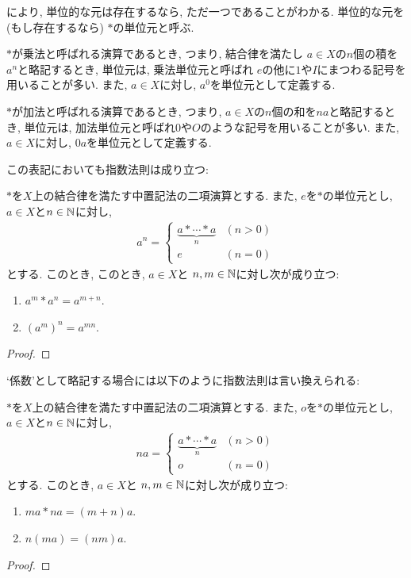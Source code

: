 \begin{remark}
  \label{rem:uniq:unit}
  により,
  単位的な元は存在するなら, ただ一つであることがわかる.
  単位的な元を (もし存在するなら)
  $\ast$の単位元と呼ぶ.

  $\ast$が乗法と呼ばれる演算であるとき,
  つまり, 結合律を満たし
  $a\in X$の$n$個の積を$a^n$と略記するとき,
  単位元は,
  乗法単位元と呼ばれ
  $e$の他に$1$や$I$にまつわる記号を用いることが多い.
  また, $a\in X$に対し, $a^0$を単位元として定義する.

  $\ast$が加法と呼ばれる演算であるとき,
  つまり, $a\in X$の$n$個の和を$na$と略記するとき,
  単位元は, 加法単位元と呼ばれ$0$や$O$のような記号を用いることが多い.
  また, $a\in X$に対し, $0a$を単位元として定義する.
\end{remark}
この表記においても指数法則は成り立つ:
\begin{prop}
  $\ast$を$X$上の結合律を満たす中置記法の二項演算とする.
  また, $e$を$\ast$の単位元とし,
  $a\in X$と$n\in\mathbb{N}$に対し,
  \begin{align*}
    a^n=
    \begin{cases}
      \underbrace{a\ast \cdots \ast a}_{n} & (n>0)\\
      e & (n=0)
    \end{cases}
  \end{align*}
  とする.
  このとき,
    このとき,
  $a\in X$と
  $n,m\in\mathbb{N}$に対し次が成り立つ:
  \begin{enumerate}
    \item $a^m\ast a^n=a^{m+n}$.
    \item $(a^m)^n=a^{mn}$.
  \end{enumerate}
\end{prop}
\begin{proof}\end{proof}

`係数'として略記する場合には以下のように指数法則は言い換えられる:
\begin{prop}
  $\ast$を$X$上の結合律を満たす中置記法の二項演算とする.
  また, $o$を$\ast$の単位元とし,
  $a\in X$と$n\in\mathbb{N}$に対し,
  \begin{align*}
    na=
    \begin{cases}
      \underbrace{a\ast \cdots \ast a}_{n} & (n>0)\\
      o & (n=0)
    \end{cases}
  \end{align*}
  とする.
  このとき,
  $a\in X$と
  $n,m\in\mathbb{N}$に対し次が成り立つ:
  \begin{enumerate}
    \item $ma\ast na=(m+n)a$.
    \item $n(ma)=(nm)a$.
  \end{enumerate}
\end{prop}
\begin{proof}\end{proof}

